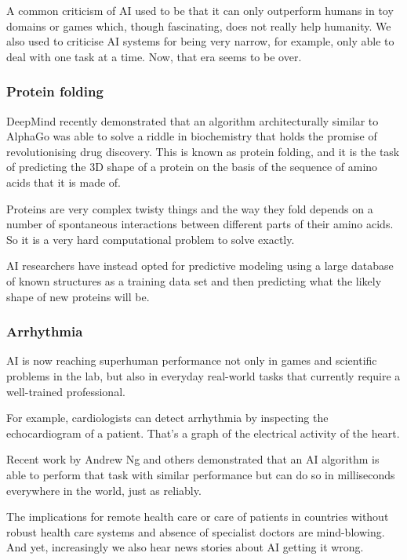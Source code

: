 \documentclass[
]{book}
\theoremstyle{definition}
\theoremstyle{definition}
\theoremstyle{definition}
\theoremstyle{definition}
\theoremstyle{remark}
\begin{document}
A common criticism of AI used to be that it can only outperform humans in toy
domains or games which, though fascinating, does not really help humanity. We also used to criticise AI systems for being very narrow, for example, only able to deal with one task at a time. Now, that era seems to be over.

\hypertarget{protein-folding}{%
\subsubsection{Protein folding}\label{protein-folding}}

DeepMind recently demonstrated that an algorithm architecturally similar to AlphaGo was able to solve a riddle in biochemistry that holds the promise of
revolutionising drug discovery. This is known as protein folding, and
it is the task of predicting the 3D shape of a protein on the basis of the sequence of amino acids that it is made of.

Proteins are very complex twisty things and the way they fold depends on a number of spontaneous interactions between different parts of their amino acids. So it is a very hard computational
problem to solve exactly.

AI researchers have instead opted for predictive modeling using a large database of known structures as a training data set and then predicting what the likely shape of new proteins will be.

\hypertarget{arrhythmia}{%
\subsubsection{Arrhythmia}\label{arrhythmia}}

AI is now reaching superhuman performance not only in games and scientific problems in the lab, but also in everyday real-world tasks that currently require
a well-trained professional.

For example, cardiologists can detect arrhythmia by inspecting the echocardiogram of a patient. That's a graph of the electrical
activity of the heart.

Recent work by Andrew Ng and others demonstrated that an AI algorithm is able to perform that task with similar performance but can do so in milliseconds everywhere in the world, just as reliably.

The implications for remote health care or care of patients in countries without robust health care systems and absence of specialist doctors are mind-blowing. And yet, increasingly we also hear news stories about AI getting it wrong.
\end{document}
